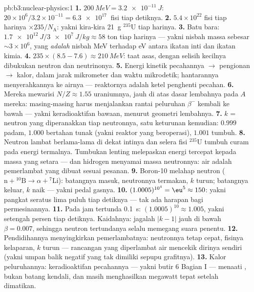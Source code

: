\begin{solution}{pb:b3:nuclear-physics:1}
\textbf{1.} $\qty{200}{MeV} = \qty{3.2e-11}{J}$:
$20\times10^6/3.2\times10^{-11} = \qty{6.3e17}{}$ fisi tiap
detiknya.
\textbf{2.} $5.4\times10^{22}$ fisi tiap harinya $\times
235/N_{\text{A}}$: yakni kira-kira \qty{21}{g} $^{235}$U tiap harinya.
\textbf{3.} Batu bara: $\qty{1.7e12}{J}/\qty{3e7}{J/kg} \approx 58$
ton tiap harinya --- yakni nisbah massa sebesar $\sim3\times10^{6}$, yang
\emph{adalah} nisbah \unit{MeV} terhadap \unit{eV} antara ikatan inti dan
ikatan kimia.
\textbf{4.} $235\times(8.5 - 7.6) \approx \qty{210}{MeV}$:
taat asas, dengan selisih kecilnya dibukukan neutron dan
neutrinonya.
\textbf{5.} Energi kinetik pecahannya $\to$ pengionan $\to$ kalor,
dalam jarak mikrometer dan waktu mikrodetik; hantarannya menyerahkannya ke
airnya --- reaktornya adalah ketel penghenti pecahan.
\textbf{6.} Mereka mewarisi $N/Z \approx 1.55$ uraniumnya, jauh
di atas dasar lembahnya pada $A$ mereka: masing-masing harus menjalankan rantai
peluruhan $\beta^-$ kembali ke bawah --- yakni keradioaktifan bawaan, menurut
geometri lembahnya.
\textbf{7.} $k$ = neutron yang diperanakkan tiap neutronnya, satu keturunan
kemudian: $0.999$ padam, $1.000$ bertahan tunak (yakni reaktor yang
beroperasi), $1.001$ tumbuh.
\textbf{8.} Neutron lambat berlama-lama di dekat intinya dan
selera fisi $^{235}$U tumbuh curam pada energi termalnya.
Tumbukan lenting melepaskan energi tercepat kepada massa yang setara ---
dan hidrogen menyamai massa neutronnya: air adalah pemerlambat
yang dibuat sesuai pesanan.
\textbf{9.} Boron-10 melahap neutron ($\text{n} + {}^{10}
\text{B} \to \alpha + {}^{7}\text{Li}$): batangnya masuk, neutronnya
termakan, $k$ turun; batangnya keluar, $k$ naik --- yakni pedal gasnya.
\textbf{10.} $(1.0005)^{10^4} = \eu^{5} \approx 150$: yakni pangkat
seratus lima puluh tiap detiknya --- tak ada harapan bagi permesinannya.
\textbf{11.} Pada jam tertunda \qty{0.1}{s}:
$(1.0005)^{10} \approx 1.005$, yakni setengah persen tiap detiknya. Kaidahnya:
jagalah $|k - 1|$ jauh di bawah $\beta = 0.007$, sehingga neutron
tertundanya selalu memegang suara penentu.
\textbf{12.} Pendidihannya menyingkirkan pemerlambatnya: neutronnya tetap cepat,
fisinya kelaparan, $k$ turun --- rancangan yang diperlambat air
mencekik dirinya sendiri (yakni umpan balik negatif yang tak dimiliki
sepupu grafitnya).
\textbf{13.} Kalor peluruhannya: keradioaktifan pecahannya ---
yakni butir 6 Bagian I --- menaati , bukan batang kendali, dan
masih menghasilkan megawatt tepat setelah dimatikan.

\end{solution}
